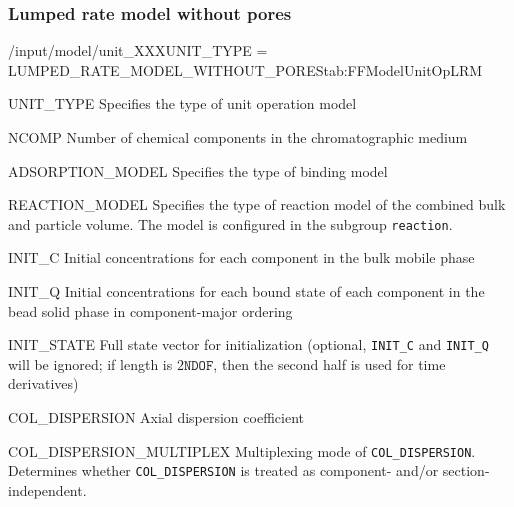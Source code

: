 \subsubsection{Lumped rate model without pores}

\begin{condsubgroup}{/input/model/unit\_XXX}{UNIT\_TYPE = LUMPED\_RATE\_MODEL\_WITHOUT\_PORES}{tab:FFModelUnitOpLRM}
  \begin{dataset}[type=string,range={\texttt{LUMPED\_RATE\_MODEL\_WITHOUT\_PORES}},length=1]{UNIT\_TYPE}
    Specifies the type of unit operation model
  \end{dataset}
  \begin{dataset}[type=int,range={$\geq 1$},length=1]{NCOMP}
    Number of chemical components in the chromatographic medium
  \end{dataset}
  \begin{dataset}[type=string,range={See Section~\ref{sec:FFAdsorption}},length=1]{ADSORPTION\_MODEL}
    Specifies the type of binding model
  \end{dataset}
  \begin{dataset}[type=string,range={See Section~\ref{sec:FFReaction}},length=1]{REACTION\_MODEL}
    Specifies the type of reaction model of the combined bulk and particle volume.
    The model is configured in the subgroup \texttt{reaction}.
  \end{dataset}
  \begin{dataset}[unit=\si{\mol\per\cubic\metre\of{IV}},type=double,range={$\geq 0$},length={\texttt{NCOMP}}]{INIT\_C}
    Initial concentrations for each component in the bulk mobile phase
  \end{dataset}
  \begin{dataset}[unit=\si{\mol\per\cubic\metre\of{SP}},type=double,range={$\geq 0$},length={\texttt{NTOTALBND}}]{INIT\_Q}
    Initial concentrations for each bound state of each component in the bead solid phase in component-major ordering
  \end{dataset}
  \begin{dataset}[unit=various,type=double,range={$\mathds{R}$},length={\texttt{NDOF} / $2\texttt{NDOF}$}]{INIT\_STATE}
    Full state vector for initialization (optional, \texttt{INIT\_C} and \texttt{INIT\_Q} will be ignored; if length is $2\texttt{NDOF}$, then the second half is used for time derivatives)
  \end{dataset}
  \begin{dataset}[unit=\si{\square\metre\of{IV}\per\second},type=double,range={$\geq 0$},length={see \texttt{COL\_DISPERSION\_MULTIPLEX}}]{COL\_DISPERSION}
    Axial dispersion coefficient
  \end{dataset}
  \begin{dataset}[unit=--,type=int,range={$\{0, \dots, 3 \}$},length={1}]{COL\_DISPERSION\_MULTIPLEX}
    Multiplexing mode of \texttt{COL\_DISPERSION}.
    Determines whether \texttt{COL\_DISPERSION} is treated as component- and/or section-independent.


\end{dataset}
\end{condsubgroup}
